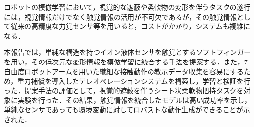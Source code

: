 \abstract

ロボットの模倣学習において，視覚的な遮蔽や柔軟物の変形を伴うタスクの遂行には，視覚情報だけでなく触覚情報の活用が不可欠であるが，その触覚情報として従来の高精度な力覚センサ等を用いると，コストがかかり，システムも複雑になる．\par
本報告では，単純な構造を持つイオン液体センサを触覚とするソフトフィンガーを用い，その低次元な変形情報を模倣学習に統合する手法を提案する．また，7自由度ロボットアームを用いた繊細な接触動作の教示データ収集を容易にするため，重力補償を導入したテレオペレーションシステムを構築し，学習と検証を行った．提案手法の評価として，視覚的遮蔽を伴うシート状柔軟物把持タスクを対象に実験を行った．その結果，触覚情報を統合したモデルは高い成功率を示し，単純なセンサであっても環境変動に対してロバストな動作生成ができることが示された．\par